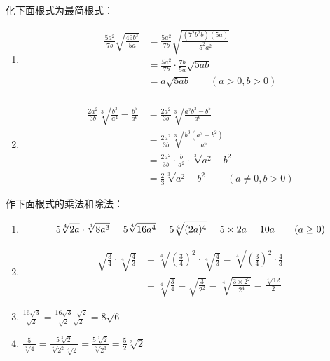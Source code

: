 \begin{example}
    化下面根式为最简根式：
\begin{enumerate}
    \item \[\begin{split}
        \frac{5 a^{2}}{7 b}\sqrt{\frac{49 b^{3}}{5 a}} &=\frac{5 a^{2}}{7 b} \sqrt{\frac{\left(7^{2} b^{2} b\right)(5 a)}{5^{2} a^{2}}} \\
    &=\frac{5 a^{2}}{7 b} \cdot \frac{7 b}{5 a} \sqrt{5 a b} \\
    &=a \sqrt{5 a b} \qquad(a>0, b>0) \\
    \end{split}\]
    \item \[\begin{split}
        \frac{2 a^{2}}{3 b} \sqrt[3]{\frac{b^{3}}{a^{4}}-\frac{b^{5}}{a^{6}}} &=\frac{2 a^{2}}{3 b}\sqrt[3]{\frac{a^{2} b^{3}-b^{5}}{a^{6}}} \\
    &=\frac{2 a^{2}}{3 b} \sqrt[3]{\frac{b^{3}\left(a^{2}-b^{2}\right)}{a^{6}}} \\
    &=\frac{2 a^{2}}{3 b} \cdot \frac{b}{a^{2}} \cdot \sqrt[3]{a^{2}-b^{2}} \\
    &=\frac{2}{3} \sqrt[3]{a^{2}-b^{2}} \qquad(a \neq 0, b>0)
    \end{split}\]
\end{enumerate}
\end{example}

\begin{example}
    作下面根式的乘法和除法：
\begin{enumerate}
    \item $$5\sqrt[4]{2a}\cdot \sqrt[4]{8a^3}=5\sqrt[4]{16a^4}=5\sqrt[4]{(2a)^4}=5\times 2a=10a\qquad (a\ge 0)$$
    \item \[\begin{split}
        \sqrt{\frac{3}{4}} \cdot \sqrt[4]{\frac{4}{3}}&=\sqrt[4]{\left(\frac{3}{4}\right)^{2}} \cdot \sqrt[4]{\frac{4}{3}}=\sqrt[4]{\left(\frac{3}{4}\right)^{2} \cdot \frac{4}{3}}\\
&=\sqrt[4]{\frac{3}{4}}=\sqrt{\frac{3}{2^{2}}}=\sqrt[4]{\frac{3 \times 2^{2}}{2^{4}}}=\frac{\sqrt[4]{12}}{2}
    \end{split}\]
    \item $\frac{16 \sqrt{3}}{\sqrt{2}}=\frac{16 \sqrt{3} \cdot \sqrt{2}}{\sqrt{2} \cdot \sqrt{2}}=8 \sqrt{6}$
    \item $\frac{5}{\sqrt[3]{4}}=\frac{5 \sqrt[3]{2}}{\sqrt[3]{2^2} \sqrt[3]{2}}=\frac{5 \sqrt[3]{2}}{\sqrt[3]{2^{3}}}=\frac{5}{2} \sqrt[3]{2}$
\end{enumerate}
\end{example}

